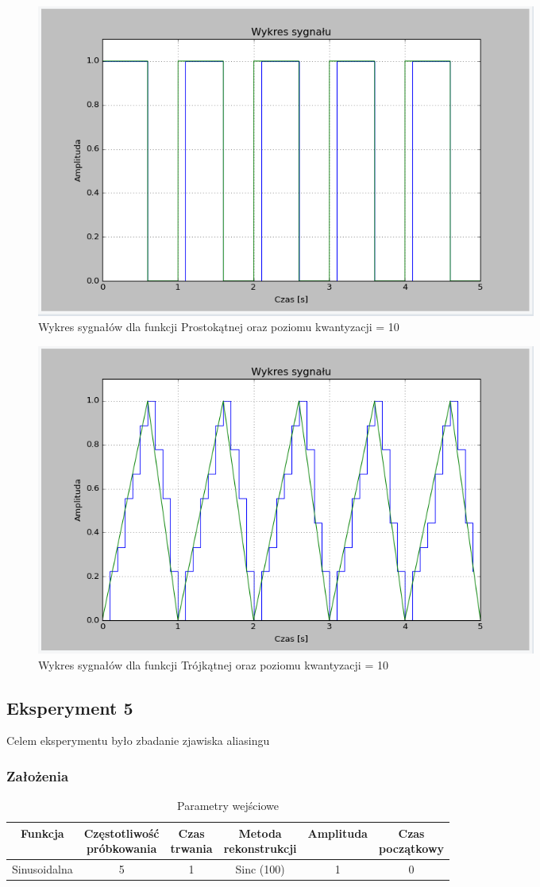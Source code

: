 \documentclass{article}
\begin{document}
    \begin{figure}[h!]
        \centering
        \includegraphics[width=0.8\textwidth]{img/1/quad_rect_2.png}
        \caption{Wykres sygnałów dla funkcji Prostokątnej oraz poziomu kwantyzacji = 10}
    \end{figure}
    \FloatBarrier

    \begin{figure}[h!]
        \centering
        \includegraphics[width=0.8\textwidth]{img/1/quad_tri_10.png}
        \caption{Wykres sygnałów dla funkcji Trójkątnej oraz poziomu kwantyzacji = 10}
    \end{figure}
    \FloatBarrier
    \subsection{Eksperyment 5}
    Celem eksperymentu było zbadanie zjawiska aliasingu

    \subsubsection{Założenia}
    \begin{table}[h!]
        \centering
        \begin{tabular}{|c|c|c|c|c|c|}
            \hline
            Funkcja & \shortstack{Częstotliwość\\ próbkowania} & \shortstack{Czas\\ trwania} & \shortstack{Metoda\\ rekonstrukcji} & Amplituda & \shortstack{Czas\\ początkowy}  \\ \hline
            Sinusoidalna & 5 & 1 & Sinc (100) & 1 & 0  \\ \hline
        \end{tabular}
        \caption{Parametry wejściowe}
    \end{table}
    
\end{document}
